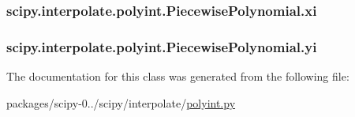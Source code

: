 \subsubsection[{xi}]{\setlength{\rightskip}{0pt plus 5cm}scipy.\+interpolate.\+polyint.\+Piecewise\+Polynomial.\+xi}\label{classscipy_1_1interpolate_1_1polyint_1_1PiecewisePolynomial_ac29518f2a5e0acb06080fcde633abb33}
\hypertarget{classscipy_1_1interpolate_1_1polyint_1_1PiecewisePolynomial_aad80e003a0ee7dda3e3df17cfc933e06}{}
\subsubsection[{yi}]{\setlength{\rightskip}{0pt plus 5cm}scipy.\+interpolate.\+polyint.\+Piecewise\+Polynomial.\+yi}\label{classscipy_1_1interpolate_1_1polyint_1_1PiecewisePolynomial_aad80e003a0ee7dda3e3df17cfc933e06}


The documentation for this class was generated from the following file\+:\begin{DoxyCompactItemize}
\item 
packages/scipy-\/0../scipy/interpolate/\hyperlink{polyint_8py}{polyint.\+py}\end{DoxyCompactItemize}
